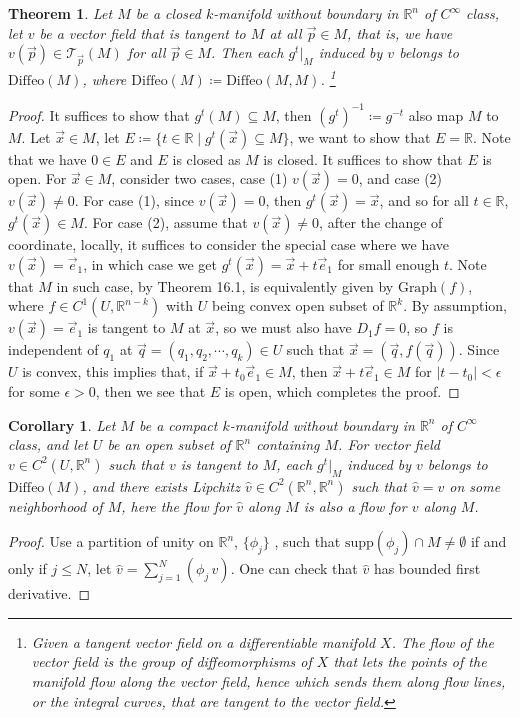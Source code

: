 \documentclass[11pt,oneside]{book}
\theoremstyle{break}
\theoremstyle{break}
\newtheorem{thm}{Theorem}[section]
\newtheorem{corT}[lem]{Corollary}
\newcommand{\R}{\mathbb{R}}
\newcommand{\T}{\mathcal{T}}
\newcommand{\supp}{\text{supp}}
\begin{document}
\begin{thm}
Let $M$ be a closed $k$-manifold without boundary in $\R^n$ of $C^\infty$ class, let $v$ be a vector field that is tangent to $M$ at all $\vec{p}\in M$, that is, we have $v(\vec{p}) \in \T_{\vec{p}}(M)$ for all $\vec{p}\in M$. Then each $g^t|_M$ induced by $v$ belongs to $\text{Diffeo}(M)$, where $\text{Diffeo}(M) \coloneqq \text{Diffeo}(M,M)$.  \footnote{Given a tangent vector field on a differentiable manifold $X$. The flow of the vector field is the group of diffeomorphisms of $X$ that lets the points of the manifold flow along the vector field, hence which sends them along flow lines, or the integral curves, that are tangent to the vector field.}
\end{thm}
\begin{proof}
It suffices to show that $g^t(M) \subseteq M$, then $(g^t)^{-1}\coloneqq g^{-t}$ also map $M$ to $M$. Let $\vec{x} \in M$, let $E \coloneqq \{ t\in \R \mid g^t(\vec{x})\subseteq M\}$, we want to show that $E = \R$. Note that we have $0 \in E$ and $E$ is closed as $M$ is closed. It suffices to show that $E$ is open. For $\vec{x}\in M$, consider two cases, case (1) $v(\vec{x}) = 0$, and case (2) $v(\vec{x})\neq 0$. For case (1), since $v(\vec{x}) = 0$, then  $g^t(\vec{x}) = \vec{x}$, and so for all $t \in \R$, $g^t(\vec{x}) \in M$. For case (2), assume that $v(\vec{x})\neq 0$, after the change of coordinate, locally, it suffices to consider the special case where we have $v(\vec{x}) = \vec{e}_1$, in which case we get $g^t(\vec{x}) = \vec{x}+ t\vec{e}_1$ for small enough $t$. Note that $M$ in such case, by Theorem 16.1, is equivalently given by $\text{Graph}(f)$, where $f \in C^1(U,\R^{n-k})$ with $U$ being convex open subset of $\R^k$. By assumption, $v(\vec{x}) = \vec{e}_1$ is tangent to $M$ at $\vec{x}$, so we must also have $D_1 f = 0$, so $f$ is independent of $q_1$ at $\vec{q}=(q_1,q_2,\cdots, q_k) \in U$ such that $\vec{x} = (\vec{q},f(\vec{q}))$. Since $U$ is convex, this implies that, if $\vec{x}+t_0 \vec{e}_1 \in M$, then $\vec{x}+t\vec{e}_1  \in M$ for $|t-t_0|<\epsilon$ for some $\epsilon>0$, then we see that $E$ is open, which completes the proof.
\end{proof}

\begin{corT}
Let $M$ be a compact $k$-manifold without boundary in $\R^n$ of $C^\infty$ class, and let $U$ be an open subset of $\R^n$ containing $M$. For vector field $v \in C^2(U, \R^n)$ such that $v$ is tangent to $M$, each $g^t|_M$ induced by $v$ belongs to $\text{Diffeo}(M)$, and there exists Lipchitz $\hat{v} \in C^2(\R^n, \R^n)$ such that $\hat{v} = v$ on some neighborhood of $M$, here the flow for $\hat{v}$ along $M$ is also a flow for $v$ along $M$.
\end{corT}
\begin{proof}
Use a partition of unity on $\R^n$, $\{\phi_j\}$ , such that $\supp(\phi_j) \cap M \neq \emptyset$ if and only if $j \leq N$, let $\hat{v} = \sum_{j=1}^N (\phi_j \, v)$. One can check that $\hat{v}$ has bounded first derivative.
\end{proof}
\end{document}
